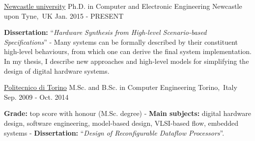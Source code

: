 
\begin{cventries}


\cventry
{\href{https://www.ncl.ac.uk/}{\color{myblue}Newcastle university}} %
{Ph.D. in Computer and Electronic Engineering} %
{Newcastle upon Tyne,~UK} %
{Jan. 2015 - PRESENT} %
{ %
\begin{cvitems}
\textbf{Dissertation:} ``\textit{Hardware Synthesis from High-level 
Scenario-based Specifications}'' - Many systems can be formally described 
by their constituent high-level behaviours, from which one can derive the final 
system implementation. In my thesis, I describe new approaches and high-level 
models for simplifying the design of digital hardware systems.
\end{cvitems}
}


\cventry
{\href{https://www.polito.it/?lang=en}{\color{myblue}Politecnico di Torino}}
{M.Sc. and B.Sc. in Computer Engineering}
{Torino,~Italy}
{Sep. 2009 - Oct. 2014}
{
\begin{cvitems}
\textbf{Grade:} top score with honour (M.Sc. degree) - \textbf{Main subjects:} 
digital hardware design, software engineering, model-based design, VLSI-based 
flow, embedded systems - \textbf{Dissertation:} ``\emph{Design of 
Reconfigurable Dataflow Processors}''.
\end{cvitems}
}


\end{cventries}